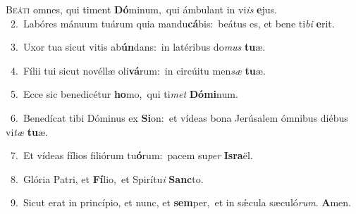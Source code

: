 \lettrine{\initial\textcolor{\initialcolor}{B}}{eáti} omnes, qui timent \textbf{Dó}\-minum,~\star qui ámbulant in vi\textit{is} \textbf{e}\-jus.\\
{\numbfont\textcolor{\numbcolor}{~2.}}~Labóres mánuum tuárum quia mandu\-\textbf{cá}\-bis:~\star beátus es, et bene ti\textit{bi} \textbf{e}\-rit.\par
{\numbfont\textcolor{\numbcolor}{~3.}}~Uxor tua sicut vitis ab\-\textbf{ún}\-dans:~\star in latéribus do\textit{mus} \textbf{tu}\-æ.\par
{\numbfont\textcolor{\numbcolor}{~4.}}~Fílii tui sicut novéllæ oli\-\textbf{vá}\-rum:~\star in circúitu men\textit{sæ} \textbf{tu}\-æ.\par
{\numbfont\textcolor{\numbcolor}{~5.}}~Ecce sic benedicétur \textbf{ho}\-mo,~\star qui ti\textit{met} \textbf{Dó}\-\textbf{mi}num.\par
{\numbfont\textcolor{\numbcolor}{~6.}}~Benedícat tibi Dóminus ex \textbf{Si}\-on:~\star et vídeas bona Jerúsalem ómnibus diébus vi\textit{tæ} \textbf{tu}\-æ.\par
{\numbfont\textcolor{\numbcolor}{~7.}}~Et vídeas fílios filiórum tu\-\textbf{ó}\-rum:~\star pacem su\textit{per} \textbf{Is}\-\textbf{ra}ël.\par
{\numbfont\textcolor{\numbcolor}{~8.}}~Glória Patri, et \textbf{Fí}\-lio,~\star et Spirítu\textit{i} \textbf{Sanc}\-to.\par
{\numbfont\textcolor{\numbcolor}{~9.}}~Sicut erat in princípio, et nunc, et \textbf{sem}\-per,~\star et in sǽcula sæculó\-\textit{rum}\-. \textbf{A}\-men.\par

